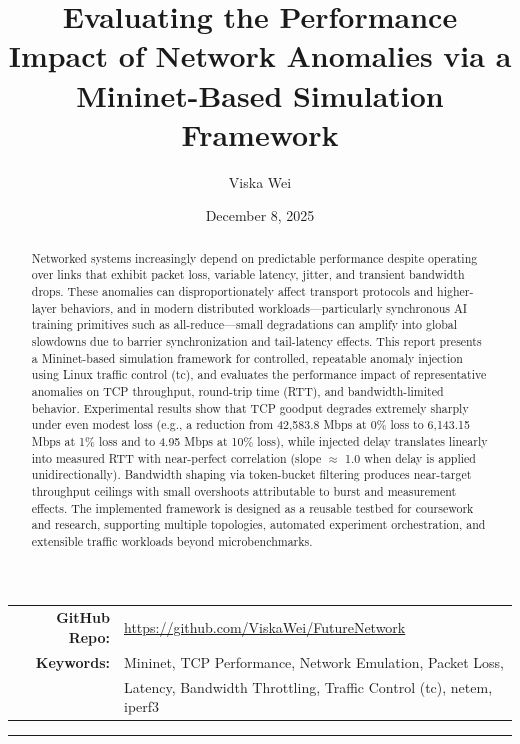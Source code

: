 \documentclass[11pt,a4paper]{article}
\title{\textbf{Evaluating the Performance Impact of Network Anomalies via a Mininet-Based Simulation Framework}}
\author{Viska Wei}
\date{December 8, 2025}
\begin{document}
\maketitle

\begin{center}
\begin{tabular}{rl}
\textbf{GitHub Repo:} & \url{https://github.com/ViskaWei/FutureNetwork} \\
\textbf{Keywords:} & Mininet, TCP Performance, Network Emulation, Packet Loss, \\
& Latency, Bandwidth Throttling, Traffic Control (tc), netem, iperf3
\end{tabular}
\end{center}

\vspace{1em}
\hrule
\vspace{1em}

\begin{abstract}
Networked systems increasingly depend on predictable performance despite operating over links that exhibit packet loss, variable latency, jitter, and transient bandwidth drops. These anomalies can disproportionately affect transport protocols and higher-layer behaviors, and in modern distributed workloads—particularly synchronous AI training primitives such as all-reduce—small degradations can amplify into global slowdowns due to barrier synchronization and tail-latency effects. This report presents a Mininet-based simulation framework for controlled, repeatable anomaly injection using Linux traffic control (tc), and evaluates the performance impact of representative anomalies on TCP throughput, round-trip time (RTT), and bandwidth-limited behavior. Experimental results show that TCP goodput degrades extremely sharply under even modest loss (e.g., a reduction from 42,583.8 Mbps at 0\% loss to 6,143.15 Mbps at 1\% loss and to 4.95 Mbps at 10\% loss), while injected delay translates linearly into measured RTT with near-perfect correlation (slope $\approx$ 1.0 when delay is applied unidirectionally). Bandwidth shaping via token-bucket filtering produces near-target throughput ceilings with small overshoots attributable to burst and measurement effects. The implemented framework is designed as a reusable testbed for coursework and research, supporting multiple topologies, automated experiment orchestration, and extensible traffic workloads beyond microbenchmarks.
\end{abstract}
\end{document}
